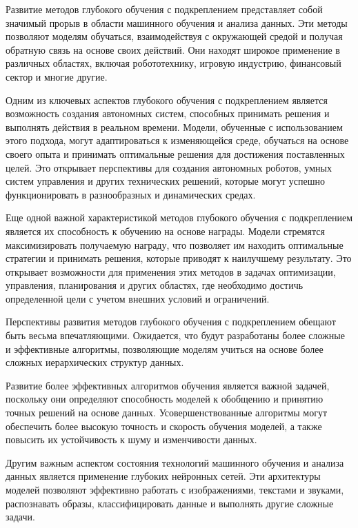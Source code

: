     Развитие методов глубокого обучения с подкреплением представляет собой значимый прорыв в области машинного обучения и анализа данных. Эти методы позволяют моделям обучаться, взаимодействуя с окружающей средой и получая обратную связь на основе своих действий. Они находят широкое применение в различных областях, включая робототехнику, игровую индустрию, финансовый сектор и многие другие.

    Одним из ключевых аспектов глубокого обучения с подкреплением является возможность создания автономных систем, способных принимать решения и выполнять действия в реальном времени. Модели, обученные с использованием этого подхода, могут адаптироваться к изменяющейся среде, обучаться на основе своего опыта и принимать оптимальные решения для достижения поставленных целей. Это открывает перспективы для создания автономных роботов, умных систем управления и других технических решений, которые могут успешно функционировать в разнообразных и динамических средах.
    
    Еще одной важной характеристикой методов глубокого обучения с подкреплением является их способность к обучению на основе награды. Модели стремятся максимизировать получаемую награду, что позволяет им находить оптимальные стратегии и принимать решения, которые приводят к наилучшему результату. Это открывает возможности для применения этих методов в задачах оптимизации, управления, планирования и других областях, где необходимо достичь определенной цели с учетом внешних условий и ограничений.
    
    Перспективы развития методов глубокого обучения с подкреплением обещают быть весьма впечатляющими. Ожидается, что будут разработаны более сложные и эффективные алгоритмы, позволяющие моделям учиться на основе более сложных иерархических структур данных.
    
    Развитие более эффективных алгоритмов обучения является важной задачей, поскольку они определяют способность моделей к обобщению и принятию точных решений на основе данных. Усовершенствованные алгоритмы могут обеспечить более высокую точность и скорость обучения моделей, а также повысить их устойчивость к шуму и изменчивости данных.
    
    Другим важным аспектом состояния технологий машинного обучения и анализа данных является применение глубоких нейронных сетей. Эти архитектуры моделей позволяют эффективно работать с изображениями, текстами и звуками, распознавать образы, классифицировать данные и выполнять другие сложные задачи.
    
